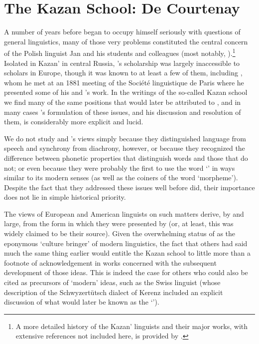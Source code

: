 \chapter{The Kazan School: De Courtenay}
\label{ch.kazan}

A number of years before {\Saussure} began to occupy himself seriously
with questions of general linguistics, many of those very problems
constituted the central concern of the Polish linguist Jan {\DeCourtenay} and his students and colleagues (most notably, ).\footnote{A more detailed history of the Kazan' linguists
  and their major works, with extensive references not included here,
  is provided by \citet{radwanska-williams21:kazan}.}  Isolated in
Kazan' in central Russia, {\Baudouin}'s scholarship was largely
inaccessible to scholars in Europe, though it was known to at least a
few of them, including {\Saussure}, whom he met at an 1881 meeting of the
Société linguistique de Paris where he presented some of his and
{\Kruszewski}'s work. In the writings of the so-called Kazan school we
find many of the same positions that would later be attributed to
{\Saussure}, and in many cases {\Baudouin}'s formulation of these issues,
and his discussion and resolution of them, is considerably more
explicit and lucid.

We do not study {\Baudouin} and {\Kruszewski}'s views simply because they
distinguished language from speech and synchrony from diachrony,
however, or because they recognized the difference between phonetic
properties that distinguish words and those that do not; or even
because they were probably the first to use the word `' in ways
similar to its modern senses (as well as the coiners of the word
`morpheme'). Despite the fact that they addressed these issues well
before {\Saussure} did, their importance does not lie in simple
historical priority.

The views of European and American linguists on such matters derive,
by and large, from the form in which they were presented by {\Saussure}
(or, at least, this was widely claimed to be their source). Given the
overwhelming status of {\Saussure} as the eponymous `{culture} bringer' of
modern linguistics, the fact that others had said much the same thing
earlier would entitle the Kazan school to little more than a footnote
of acknowledgement in works concerned with the subsequent development
of those ideas. This is indeed the case for others who could also be
cited as precursors of `modern' ideas, such as the Swiss linguist  (whose \citeyear{winteler76:kerenz} description of the
Schwyzertütsch dialect of Kerenz included an explicit discussion of
what would later be known as the `').

